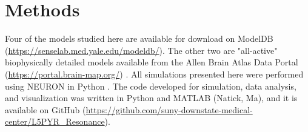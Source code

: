 \documentclass[utf8]{frontiersSCNS} %
\begin{document}
\section{Methods}
Four of the models studied here \citep{Kole2008-aj, Acker2009-yj, Hay2011-if, Neymotin2017-dr} 
are available for download on ModelDB (\url{https://senselab.med.yale.edu/modeldb/}).  The other two are "all-active"
biophysically detailed models available from the Allen Brain Atlas Data Portal (\url{https://portal.brain-map.org/}) \citep{Reimann2013-mg, Shai2015-ff, Markram2015-zg}.
All simulations presented here were performed using NEURON in Python \citep{Hines2009-qx}. 
The code developed for simulation, data analysis, and visualization was written in Python and MATLAB (Natick, Ma), 
and it is available on GitHub (\url{https://github.com/suny-downstate-medical-center/L5PYR\_Resonance}).
\end{document}
